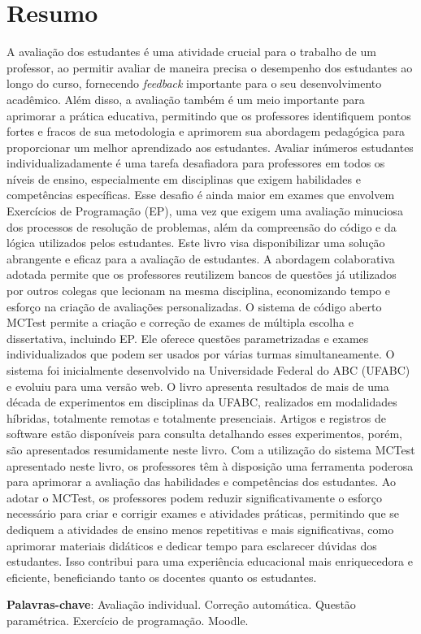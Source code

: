 \chapter*{Resumo}\normalsize

A avaliação dos estudantes é uma atividade crucial para o trabalho de um professor, ao permitir avaliar de maneira precisa o desempenho dos estudantes ao longo do curso, fornecendo \textit{feedback} importante para o seu desenvolvimento acadêmico. Além disso, a avaliação também é um meio importante para aprimorar a prática educativa, permitindo que os professores identifiquem pontos fortes e fracos de sua metodologia e aprimorem sua abordagem pedagógica para proporcionar um melhor aprendizado aos estudantes.
Avaliar inúmeros estudantes individualizadamente é uma tarefa desafiadora para professores em todos os níveis de ensino, especialmente em disciplinas que exigem habilidades e competências específicas. Esse desafio é ainda maior em exames que envolvem Exercícios de Programação (EP), uma vez que exigem uma avaliação minuciosa dos processos de resolução de problemas, além da compreensão do código e da lógica utilizados pelos estudantes. 
Este livro visa disponibilizar uma solução abrangente e eficaz para a avaliação de estudantes. A abordagem colaborativa adotada permite que os professores reutilizem bancos de questões já utilizados por outros colegas que lecionam na mesma disciplina, economizando tempo e esforço na criação de avaliações personalizadas.
O sistema de código aberto MCTest permite a criação e correção de exames de múltipla escolha e dissertativa, incluindo EP. Ele oferece questões parametrizadas e exames individualizados que podem ser usados por várias turmas simultaneamente. O sistema foi inicialmente desenvolvido na Universidade Federal do ABC (UFABC) e evoluiu para uma versão web.
O livro apresenta resultados de mais de uma década de experimentos em disciplinas da UFABC, realizados em modalidades híbridas, totalmente remotas e totalmente presenciais. Artigos e registros de software estão disponíveis para consulta detalhando esses experimentos, porém, são apresentados resumidamente neste livro.
Com a utilização do sistema MCTest apresentado neste livro, os professores têm à disposição uma ferramenta poderosa para aprimorar a avaliação das habilidades e competências dos estudantes. Ao adotar o MCTest, os professores podem reduzir significativamente o esforço necessário para criar e corrigir exames e atividades práticas, permitindo que se dediquem a atividades de ensino menos repetitivas e mais significativas, como aprimorar materiais didáticos e dedicar tempo para esclarecer dúvidas dos estudantes. Isso contribui para uma experiência educacional mais enriquecedora e eficiente, beneficiando tanto os docentes quanto os estudantes.\\ \vspace{5mm}

\noindent
 \textbf{Palavras-chave}: 
Avaliação individual.
Correção automática.
Questão paramétrica.
Exercício de programação.
Moodle.